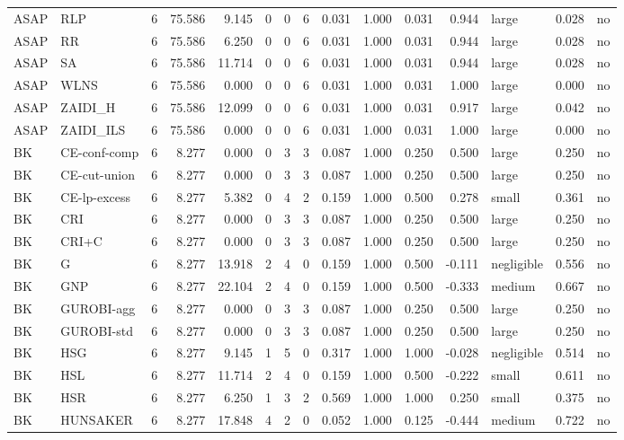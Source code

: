 \begin{table}[htbp]
\begin{tabular}{llrrrrrrrrrrlrr}
ASAP & RLP & 6 & 75.586 & 9.145 & 0 & 0 & 6 & 0.031 & 1.000 & 0.031 & 0.944 & large & 0.028 & no \\
ASAP & RR & 6 & 75.586 & 6.250 & 0 & 0 & 6 & 0.031 & 1.000 & 0.031 & 0.944 & large & 0.028 & no \\
ASAP & SA & 6 & 75.586 & 11.714 & 0 & 0 & 6 & 0.031 & 1.000 & 0.031 & 0.944 & large & 0.028 & no \\
ASAP & WLNS & 6 & 75.586 & 0.000 & 0 & 0 & 6 & 0.031 & 1.000 & 0.031 & 1.000 & large & 0.000 & no \\
ASAP & ZAIDI\_H & 6 & 75.586 & 12.099 & 0 & 0 & 6 & 0.031 & 1.000 & 0.031 & 0.917 & large & 0.042 & no \\
ASAP & ZAIDI\_ILS & 6 & 75.586 & 0.000 & 0 & 0 & 6 & 0.031 & 1.000 & 0.031 & 1.000 & large & 0.000 & no \\
BK & CE-conf-comp & 6 & 8.277 & 0.000 & 0 & 3 & 3 & 0.087 & 1.000 & 0.250 & 0.500 & large & 0.250 & no \\
BK & CE-cut-union & 6 & 8.277 & 0.000 & 0 & 3 & 3 & 0.087 & 1.000 & 0.250 & 0.500 & large & 0.250 & no \\
BK & CE-lp-excess & 6 & 8.277 & 5.382 & 0 & 4 & 2 & 0.159 & 1.000 & 0.500 & 0.278 & small & 0.361 & no \\
BK & CRI & 6 & 8.277 & 0.000 & 0 & 3 & 3 & 0.087 & 1.000 & 0.250 & 0.500 & large & 0.250 & no \\
BK & CRI+C & 6 & 8.277 & 0.000 & 0 & 3 & 3 & 0.087 & 1.000 & 0.250 & 0.500 & large & 0.250 & no \\
BK & G & 6 & 8.277 & 13.918 & 2 & 4 & 0 & 0.159 & 1.000 & 0.500 & -0.111 & negligible & 0.556 & no \\
BK & GNP & 6 & 8.277 & 22.104 & 2 & 4 & 0 & 0.159 & 1.000 & 0.500 & -0.333 & medium & 0.667 & no \\
BK & GUROBI-agg & 6 & 8.277 & 0.000 & 0 & 3 & 3 & 0.087 & 1.000 & 0.250 & 0.500 & large & 0.250 & no \\
BK & GUROBI-std & 6 & 8.277 & 0.000 & 0 & 3 & 3 & 0.087 & 1.000 & 0.250 & 0.500 & large & 0.250 & no \\
BK & HSG & 6 & 8.277 & 9.145 & 1 & 5 & 0 & 0.317 & 1.000 & 1.000 & -0.028 & negligible & 0.514 & no \\
BK & HSL & 6 & 8.277 & 11.714 & 2 & 4 & 0 & 0.159 & 1.000 & 0.500 & -0.222 & small & 0.611 & no \\
BK & HSR & 6 & 8.277 & 6.250 & 1 & 3 & 2 & 0.569 & 1.000 & 1.000 & 0.250 & small & 0.375 & no \\
BK & HUNSAKER & 6 & 8.277 & 17.848 & 4 & 2 & 0 & 0.052 & 1.000 & 0.125 & -0.444 & medium & 0.722 & no \\

\end{tabular}
\end{table}
